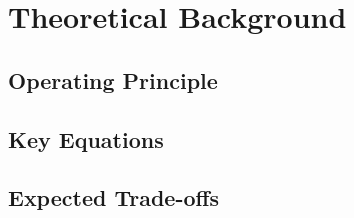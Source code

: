
\section{Theoretical Background}
\label{sec:theory}

\subsection{Operating Principle}



\subsection{Key Equations}



\subsection{Expected Trade-offs}

